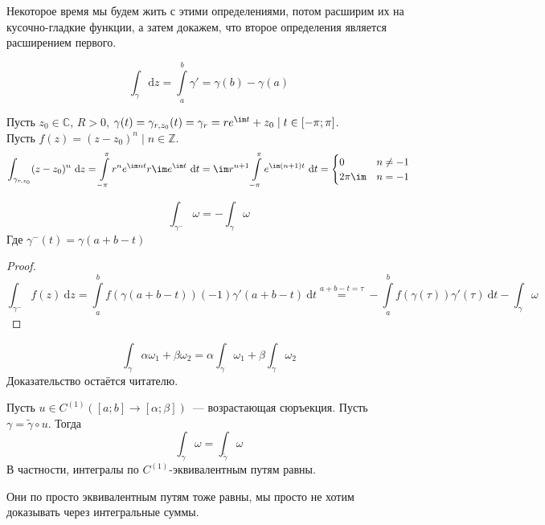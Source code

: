\documentclass{article}
\begin{document}
    \begin{remark}
        Некоторое время мы будем жить с этими определениями, потом расширим их на кусочно-гладкие функции, а затем докажем, что второе определения является расширением первого.
    \end{remark}
    \begin{example}
        $$
        \int_\gamma\mathrm dz=\int\limits_a^b\gamma'=\gamma(b)-\gamma(a)
        $$
    \end{example}
    \begin{example}
        Пусть $z_0\in\mathbb C$, $R>0$, $\gamma(t)=\gamma_{r,z_0}(t)=\gamma_r=re^{\im t}+z_0\mid t\in[-\pi;\pi]$.\\
        Пусть $f(z)=(z-z_0)^n\mid n\in\mathbb Z$.
        $$
        \int_{\gamma_{r,z_0}}(z-z_0)^n~\mathrm dz=\int\limits_{-\pi}^\pi r^ne^{\im nt}r\im e^{\im t}~\mathrm dt=\im r^{n+1}\int\limits_{-\pi}^\pi e^{\im(n+1)t}~\mathrm dt=\begin{cases}
            0&n\neq-1\\
            2\pi\im&n=-1
        \end{cases}
        $$
    \end{example}
    \begin{property}
        $$
        \int_{\gamma^-}\omega=-\int_\gamma\omega
        $$
        Где $\gamma^-(t)=\gamma(a+b-t)$
    \end{property}
    \begin{proof}
        $$
        \int_{\gamma^-}f(z)~\mathrm dz=\int\limits_a^bf(\gamma(a+b-t))(-1)\gamma'(a+b-t)~\mathrm dt\overset{a+b-t=\tau}=-\int\limits_a^bf(\gamma(\tau))\gamma'(\tau)~\mathrm dt-\int_\gamma\omega
        $$
    \end{proof}
    \begin{property}[Линейность]
        $$
        \int_\gamma\alpha\omega_1+\beta\omega_2=\alpha\int_\gamma\omega_1+\beta\int_\gamma\omega_2
        $$
        Доказательство остаётся читателю.
    \end{property}
    \begin{property}
        \label{Независимость интеграла 2 рода от параметризации}
        Пусть $u\in C^{(1)}([a;b]\to[\alpha;\beta])$~--- возрастающая сюръекция. Пусть $\gamma=\tilde\gamma\circ u$. Тогда
        $$
        \int_\gamma\omega=\int_{\tilde\gamma}\omega
        $$
        В частности, интегралы по $C^{(1)}$-эквивалентным путям равны.
    \end{property}
    \begin{remark}
        Они по просто эквивалентным путям тоже равны, мы просто не хотим доказывать через интегральные суммы.
    \end{remark}
\end{document}
